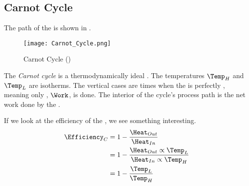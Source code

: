 \subsection{Carnot Cycle}\label{subsec:Carnot_Cycle}
The  path of the  is shown in .

\begin{figure}[h!tbp]
  \centering
  \texttt{[image: Carnot\_Cycle.png]}
  \caption{Carnot Cycle (\cite[pg. 252]{ThermoTextbook})}
  \label{fig:Carnot_Cycle}
\end{figure}

\begin{definition}\label{def:Carnot_Cycle}
  The \emph{Carnot cycle} is a thermodynamically ideal .
  The temperatures $\Temp_{H}$ and $\Temp_{L}$ are isotherms.
  The vertical cases are times when the  is perfectly , meaning only , $\Work$, is done.
  The interior of the cycle's process path is the net work done by the .
\end{definition}

If we look at the efficiency of the , we see something interesting.
\begin{align*}
  \Efficiency_{C} &= 1 - \frac{\Heat_{Out}}{\Heat_{In}} \\
                  &= 1 - \frac{\Heat_{Out} \propto \Temp_{L}}{\Heat_{In} \propto \Temp_{H}} \\
                  &= 1 - \frac{\Temp_{L}}{\Temp_{H}}
\end{align*}


